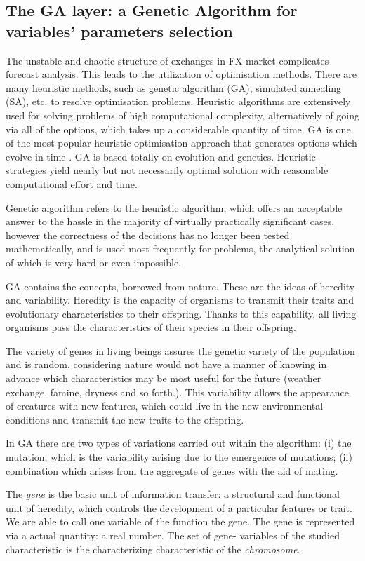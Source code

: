 \subsection{The GA layer: a Genetic Algorithm for variables' parameters selection}
The unstable and chaotic structure of exchanges in FX market complicates forecast analysis. This leads to the utilization of optimisation methods. There are many heuristic methods, such as genetic algorithm (GA), simulated annealing (SA), etc. to resolve optimisation problems. Heuristic algorithms are extensively used for solving problems of high computational complexity, alternatively of going via all of the options, which takes up a considerable quantity of time. GA is one of the most popular heuristic optimisation approach that generates options which evolve in time \cite{OZTURK2016170}. GA is based totally on evolution and genetics. Heuristic strategies yield nearly but not necessarily optimal solution with reasonable computational effort and time.

Genetic algorithm refers to the heuristic algorithm, which offers an acceptable answer to the hassle in the majority of virtually practically significant cases, however the correctness of the decisions has no longer been tested mathematically, and is used most frequently for problems, the analytical solution of which is very hard or even impossible.

GA contains the concepts, borrowed from nature. These are the ideas of heredity and variability. Heredity is the capacity of organisms to transmit their traits and evolutionary characteristics to their offspring. Thanks to this capability, all living organisms pass the characteristics of their species in their offspring.

The variety of genes in living beings assures the genetic variety of the population and is random, considering nature would not have a manner of knowing in advance which characteristics may be most useful for the future (weather exchange, famine, dryness and so forth.). This variability allows the appearance of creatures with new features, which could live in the new environmental conditions and transmit the new traits to the offspring.

In GA there are two types of variations carried out within the algorithm: (i) the mutation, which is the variability arising due to the emergence of mutations; (ii) combination which arises from the aggregate of genes with the aid of mating.

The \textit{gene} is the basic unit of information transfer: a structural and functional unit of heredity, which controls the development of a particular features or trait. We are able to call one variable of the function the gene. The gene is represented via a actual quantity: a real number. The set of gene- variables of the studied characteristic is the characterizing characteristic of the \textit{chromosome}.

